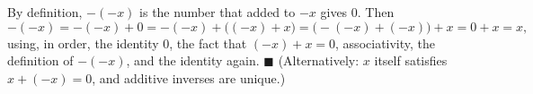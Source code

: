 By definition, $-(-x)$ is the number that added to $-x$ gives $0$. Then
\[
-(-x)=-(-x)+0=-(-x)+\bigl((-x)+x\bigr)=\bigl(-(-x)+(-x)\bigr)+x=0+x=x,
\]
using, in order, the identity $0$, the fact that $(-x)+x=0$, associativity, the definition of $-(-x)$, and the identity again. $\blacksquare$ (Alternatively: $x$ itself satisfies $x+(-x)=0$, and additive inverses are unique.)
